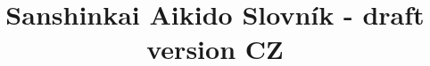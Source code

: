 \documentclass{memoir}
\begin{document}
\title{Sanshinkai Aikido Slovník - draft version CZ}
\maketitle


\end{document}
